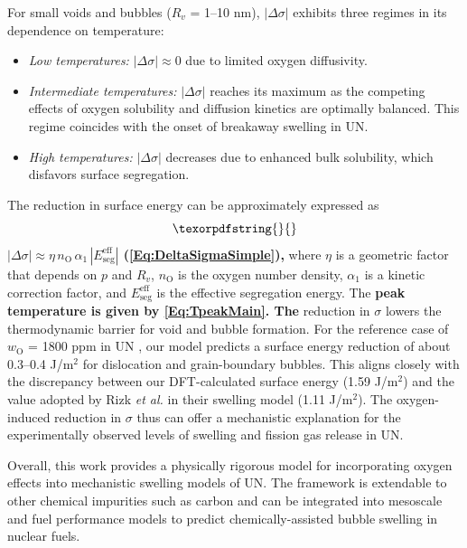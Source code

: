 \documentclass[preprint,12pt,sort&compress]{elsarticle}
\newcommand{\?}{\stackrel{?}{=}}
\providecommand{\DIFaddtex}[1]{{\bf #1}} %
\providecommand{\DIFdeltex}[1]{} %
\providecommand{\DIFaddbegin}{\protect\color{blue}} %
\providecommand{\DIFaddend}{\protect\color{black}} %
\providecommand{\DIFdelbegin}{\protect\color{red}} %
\providecommand{\DIFdelend}{\protect\color{black}} %
\providecommand{\DIFadd}[1]{\texorpdfstring{\DIFaddtex{#1}}{#1}} %
\providecommand{\DIFdel}[1]{\texorpdfstring{\DIFdeltex{#1}}{}} %
\newcommand{\DIFscaledelfig}{0.5}
\newlength{\DIFdelgraphicswidth} %
\newlength{\DIFdelgraphicsheight} %
\newcommand{\DIFaddincludegraphics}[2][]{{\color{blue}\fbox{\DIFOincludegraphics[#1]{#2}}}} %
\newcommand{\DIFdelincludegraphics}[2][]{%
\sbox{\DIFdelgraphicsbox}{\DIFOincludegraphics[#1]{#2}}%
\settoboxwidth{\DIFdelgraphicswidth}{\DIFdelgraphicsbox} %
\settoboxtotalheight{\DIFdelgraphicsheight}{\DIFdelgraphicsbox} %
\scalebox{\DIFscaledelfig}{%
\parbox[b]{\DIFdelgraphicswidth}{\usebox{\DIFdelgraphicsbox}\\[-\baselineskip] \rule{\DIFdelgraphicswidth}{0em}}\llap{\resizebox{\DIFdelgraphicswidth}{\DIFdelgraphicsheight}{%
\setlength{\unitlength}{\DIFdelgraphicswidth}%
\begin{picture}(1,1)%
\thicklines\linethickness{2pt} %
{\color[rgb]{1,0,0}\put(0,0){\framebox(1,1){}}}%
{\color[rgb]{1,0,0}\put(0,0){\line( 1,1){1}}}%
{\color[rgb]{1,0,0}\put(0,1){\line(1,-1){1}}}%
\end{picture}%
}\hspace*{3pt}}} %
} %
\DeclareRobustCommand{\DIFaddbegin}{\DIFOaddbegin \let\includegraphics\DIFaddincludegraphics} %
\DeclareRobustCommand{\DIFaddend}{\DIFOaddend \let\includegraphics\DIFOincludegraphics} %
\DeclareRobustCommand{\DIFdelbegin}{\DIFOdelbegin \let\includegraphics\DIFdelincludegraphics} %
\DeclareRobustCommand{\DIFdelend}{\DIFOaddend \let\includegraphics\DIFOincludegraphics} %
\begin{document}
\vspace{0.5cm}

For small voids and bubbles ($R_v$ = 1--10 nm), $|\Delta \sigma|$ exhibits three regimes in its dependence on temperature:
    \begin{itemize}
    \item \textit{Low temperatures:} $|\Delta \sigma| \approx 0$ due to limited oxygen diffusivity.
    \item \textit{Intermediate temperatures:} $|\Delta \sigma|$ reaches its maximum as the competing effects of oxygen solubility and diffusion kinetics are optimally balanced. This regime coincides with the onset of breakaway swelling in UN.
    \item \textit{High temperatures:} $|\Delta \sigma|$ decreases due to enhanced bulk solubility, which disfavors surface segregation.
    \end{itemize}

The reduction in surface energy can be approximately expressed as \DIFdelbegin \DIFdel{:
}\[
\DIFdel{|\Delta \sigma| \approx \eta \, n_\text{O} \, \alpha_1 \, |E_\text{seg}^\text{eff}|,
}\]%
\DIFdelend \DIFaddbegin \DIFadd{$|\Delta \sigma| \approx \eta \, n_\text{O} \, \alpha_1 \, |E_\text{seg}^\text{eff}|$ (\cref{Eq:DeltaSigmaSimple}), }\DIFaddend where $\eta$ is a geometric factor that depends on $p$ and $R_v$, $n_\text{O}$ is the oxygen number density, $\alpha_1$ is a kinetic correction factor, and $E_\text{seg}^\text{eff}$ is the effective segregation energy. The \DIFaddbegin \DIFadd{peak temperature is given by \cref{Eq:TpeakMain}. The }\DIFaddend reduction in $\sigma$ lowers the thermodynamic barrier for void and bubble formation. For the reference case of $w_\text{O}$ = 1800 ppm in UN \cite{Ronchi1975}, our model predicts a surface energy reduction of about 0.3--0.4 J/m$^2$ for dislocation and grain-boundary bubbles. This aligns closely with the discrepancy between our DFT-calculated surface energy (1.59 J/m$^2$) and the value adopted by Rizk \textit{et al.} \cite{Rizk2025} in their swelling model (1.11 J/m$^2$). The oxygen-induced reduction in $\sigma$ thus can offer a mechanistic explanation for the experimentally observed levels of swelling and fission gas release in UN. %

Overall, this work provides a physically rigorous model for incorporating oxygen effects into mechanistic swelling models of UN. The framework is extendable to other chemical impurities such as carbon and can be integrated into mesoscale and fuel performance models to predict chemically-assisted bubble swelling in nuclear fuels.
\end{document}
